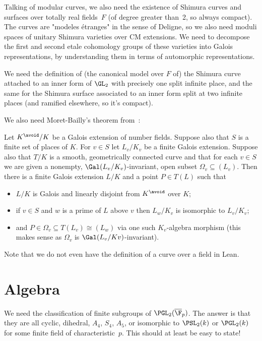 Talking of modular curves, we also need the existence of Shimura curves and surfaces over totally real fields~$F$ (of degree greater than~2, so always compact). The curves are "modeles \'etranges" in the sense of Deligne, so we also need moduli spaces of unitary Shimura varieties over CM extensions. We need to decompose the first and second etale cohomology groups of these varieties into Galois representations, by understanding them
in terms of automorphic representations.

\begin{definition}\label{Shimura_varieties}\notready We need the definition of (the canonical model over $F$ of) the Shimura curve attached to an inner form of $\GL_2$ with precisely one split infinite place, and the same for the Shimura surface associated to an inner form split at two infinite places (and ramified elsewhere, so it's compact).
\end{definition}

We also need Moret-Bailly's theorem from~\cite{moret-bailly}:

\begin{theorem}\label{moret-bailly}\notready Let $K^{\avoid}/K$ be a Galois extension of number fields. Suppose also
that $S$ is a finite set of places of $K$. For $v\in S$ let $L_v/K_v$ be a finite Galois extension.
Suppose also that $T /K$ is a smooth, geometrically connected curve and that for each
$v\in S$ we are given a nonempty, $\Gal(L_v/K_v)$-invariant, open subset $\Omega_v\subseteq (L_v)$.
Then there is a finite Galois extension $L/K$ and a point $P ∈ T (L)$ such that
\begin{itemize}
\item $L/K$ is Galois and linearly disjoint from $K^{\avoid}$ over $K$;
\item if $v\in S$ and $w$ is a prime of $L$ above $v$ then $L_w /K_v$ is isomorphic to $L_v/K_v$;
\item and $P \in\Omega_v\subseteq T (L_v) \cong (L_w)$ via one such $K_v$-algebra morphism
(this makes sense as $\Omega_v$ is $\Gal(L_v/K v)$-invariant).
\end{itemize}
\end{theorem}

Note that we do not even have the definition of a curve over a field in Lean.

\section{Algebra}

We need the classification of finite subgroups of $\PGL_2(\overline{\F}_p)$. The answer is that they are all cyclic, dihedral, $A_4$, $S_4$, $A_5$, or isomorphic to $\PSL_2(k)$ or $\PGL_2(k)$ for some finite field of characteristic~$p$. This should at least be easy to state!
